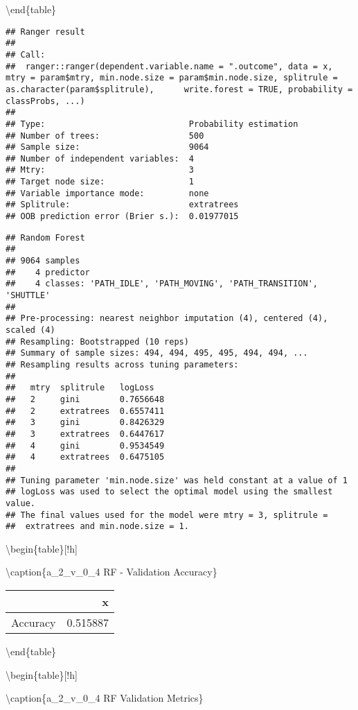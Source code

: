 \documentclass[]{article}
\begin{document}
\textbackslash{}end\{table\}

\begin{verbatim}
## Ranger result
## 
## Call:
##  ranger::ranger(dependent.variable.name = ".outcome", data = x,      mtry = param$mtry, min.node.size = param$min.node.size, splitrule = as.character(param$splitrule),      write.forest = TRUE, probability = classProbs, ...) 
## 
## Type:                             Probability estimation 
## Number of trees:                  500 
## Sample size:                      9064 
## Number of independent variables:  4 
## Mtry:                             3 
## Target node size:                 1 
## Variable importance mode:         none 
## Splitrule:                        extratrees 
## OOB prediction error (Brier s.):  0.01977015
\end{verbatim}

\begin{verbatim}
## Random Forest 
## 
## 9064 samples
##    4 predictor
##    4 classes: 'PATH_IDLE', 'PATH_MOVING', 'PATH_TRANSITION', 'SHUTTLE' 
## 
## Pre-processing: nearest neighbor imputation (4), centered (4), scaled (4) 
## Resampling: Bootstrapped (10 reps) 
## Summary of sample sizes: 494, 494, 495, 495, 494, 494, ... 
## Resampling results across tuning parameters:
## 
##   mtry  splitrule   logLoss  
##   2     gini        0.7656648
##   2     extratrees  0.6557411
##   3     gini        0.8426329
##   3     extratrees  0.6447617
##   4     gini        0.9534549
##   4     extratrees  0.6475105
## 
## Tuning parameter 'min.node.size' was held constant at a value of 1
## logLoss was used to select the optimal model using the smallest value.
## The final values used for the model were mtry = 3, splitrule =
##  extratrees and min.node.size = 1.
\end{verbatim}

\textbackslash{}begin\{table\}{[}!h{]}

\textbackslash{}caption\{\label{tab:a_2_v_0_4-rf-params}a\_2\_v\_0\_4 RF
- Validation Accuracy\} \centering

\begin{tabular}[t]{lr}
\toprule
  & x\\
\midrule
Accuracy & 0.515887\\
\bottomrule
\end{tabular}

\textbackslash{}end\{table\}

\textbackslash{}begin\{table\}{[}!h{]}

\textbackslash{}caption\{\label{tab:a_2_v_0_4-rf-params}a\_2\_v\_0\_4 RF
Validation Metrics\} \centering
\end{document}
